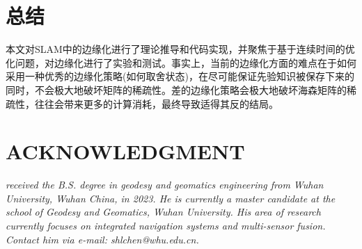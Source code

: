 \documentclass[12pt, onecolumn]{article}
\newcommand\normf{\fangsong}
\begin{document}
		\section{\normf 总结}
		本文对SLAM中的边缘化进行了理论推导和代码实现，并聚焦于基于连续时间的优化问题，对边缘化进行了实验和测试。事实上，当前的边缘化方面的难点在于如何采用一种优秀的边缘化策略(如何取舍状态)，在尽可能保证先验知识被保存下来的同时，不会极大地破坏矩阵的稀疏性。差的边缘化策略会极大地破坏海森矩阵的稀疏性，往往会带来更多的计算消耗，最终导致适得其反的结局。
		
	\newpage
	
	
		
	\newpage
	\section*{ACKNOWLEDGMENT}
	\begin{tcolorbox}[colback=white,colframe=white!70!black,title={\bfseries Author Information}]
	\par\noindent
		\parbox[t]{\linewidth}{
	 \noindent{}
	 \emph{
	 received the B.S. degree in geodesy and geomatics engineering from Wuhan University, Wuhan China, in 2023.
	 He is currently a master candidate at the school of Geodesy and Geomatics, Wuhan University. His area of research currently focuses on integrated navigation systems and multi-sensor fusion.
	 Contact him via e-mail: shlchen@whu.edu.cn.
	 }}
	\end{tcolorbox}
		
		
\end{document}
